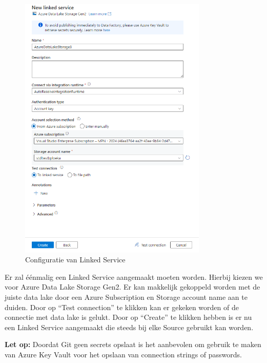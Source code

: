 \begin{figure}[H]
    \centering
    \includegraphics[width=0.8\textwidth]{./graphics/adf/source_table_3_specific}
    \caption{Configuratie van Linked Service}
    \label{fig:linked-service}
\end{figure}

Er zal éénmalig een Linked Service aangemaakt moeten worden. Hierbij kiezen we voor Azure Data Lake Storage Gen2. Er kan makkelijk gekoppeld worden met de juiste data lake door een Azure Subscription en Storage account name aan te duiden. Door op ``Test connection'' te klikken kan er gekeken worden of de connectie met data lake is gelukt. Door op ``Create'' te klikken hebben is er nu een Linked Service aangemaakt die steeds bij elke Source gebruikt kan worden.

\textbf{Let op:} Doordat Git geen secrets opslaat is het aanbevolen om gebruik te maken van Azure Key Vault voor het opslaan van connection strings of passwords.

